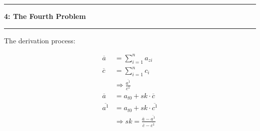 \documentclass[11pt]{article}
\newcommand\question[2]{\vspace{.25in}\hrule\textbf{#1: #2}\vspace{.5em}\hrule\vspace{.10in}}
\begin{document}
\question{4}{The Fourth Problem}
The derivation process:

\begin{align}
    \overline{a} &= \sum_{i=1}^{n}a_{zi}\\
    \overline{c} &= \sum_{i=1}^{n}c_i\\
    &\Rightarrow \frac{\overline{a^1}}{c^1}\\
    \overline{a} &= a_{t0} + sk \cdot \overline{c}\\
    \overline{a^1} &= a_{t0} + sk \cdot \overline{c^1}\\
    &\Rightarrow sk = \frac{\overline{a}-\overline{a^1}}{\overline{c}-\overline{c^1}}
\end{align}
\end{document}
